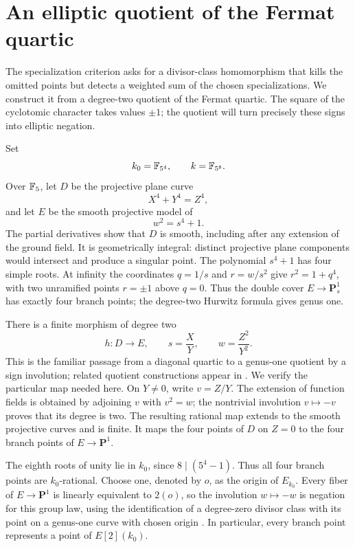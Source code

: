 \section{An elliptic quotient of the Fermat quartic}
\label{sec:finite-geometry}

The specialization criterion asks for a divisor-class homomorphism
that kills the omitted points but detects a weighted sum of the
chosen specializations. We construct it from a degree-two quotient
of the Fermat quartic. The square of the cyclotomic character takes
values $\pm1$; the quotient will turn precisely these signs into
elliptic negation.

Set
\[
    k_0=\mathbb F_{5^4},\qquad k=\mathbb F_{5^8}.
\]
Over $\mathbb F_5$, let $D$ be the projective plane curve
\[
    X^4+Y^4=Z^4,
\]
and let $E$ be the smooth projective model of
\[
    w^2=s^4+1.
\]
The partial derivatives show that $D$ is smooth, including after any
extension of the ground field. It is geometrically integral: distinct
projective plane components would intersect and produce a singular point.
The polynomial $s^4+1$ has four simple roots. At infinity the coordinates
$q=1/s$ and $r=w/s^2$ give $r^2=1+q^4$, with two unramified points
$r=\pm1$ above $q=0$. Thus the double cover $E\to\mathbf P^1_s$ has
exactly four branch points; the degree-two Hurwitz formula gives
genus one.

There is a finite morphism of degree two
\begin{equation}
\label{eq:elliptic-quotient}
    h:D\longrightarrow E,
    \qquad s=\frac XY,\qquad w=\frac{Z^2}{Y^2}.
\end{equation}
This is the familiar passage from a diagonal quartic to a genus-one
quotient by a sign involution; related quotient constructions appear
in \cite[\S1, equations~(1.1)--(1.3)]{FlynnWetherell2001}.
We verify the particular map needed here. On $Y\ne0$, write $v=Z/Y$. The extension of function fields is
obtained by adjoining $v$ with $v^2=w$; the nontrivial involution
$v\mapsto-v$ proves that its degree is two. The resulting rational map
extends to the smooth projective curves and is finite. It maps the four
points of $D$ on $Z=0$ to the four branch points of $E\to\mathbf P^1$.

The eighth roots of unity lie in $k_0$, since $8\mid(5^4-1)$.
Thus all four branch points are $k_0$-rational. Choose one, denoted by $o$,
as the origin of $E_{k_0}$. Every fiber of $E\to\mathbf P^1$ is linearly
equivalent to $2(o)$, so the involution $w\mapsto-w$ is negation for this
group law, using the identification of a degree-zero divisor class
with its point on a genus-one curve with chosen origin
\cite[Proposition~III.3.4]{Silverman2009}. In particular, every branch point represents a point of
$E[2](k_0)$.

